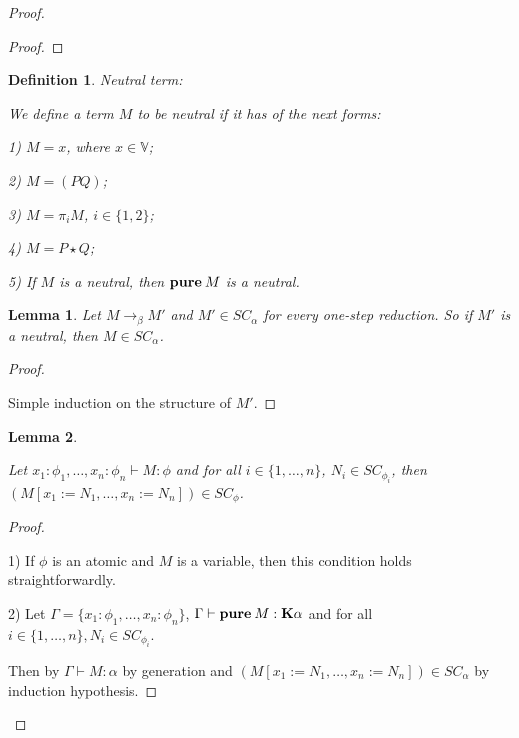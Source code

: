 \documentclass[a4paper]{article}
\newtheorem{lemma}{Lemma}
\newtheorem{defin}{Definition}
\begin{document}
\begin{proof}
\begin{proof}
  \end{proof}

  \begin{defin} Neutral term:

  We define a term $M$ to be neutral if it has of the next forms:

  1) $M = x$, where $x \in \mathbb{V}$;

  2) $M = (P Q)$;

  3) $M = \pi_i M$, $i \in \{ 1,2 \}$;

  4) $M = P \star Q$;

  5) If $M$ is a neutral, then ${\bf pure \: } M$ is a neutral.

  \end{defin}

  \begin{lemma}

  Let $M \rightarrow_{\beta} M'$ and $M' \in SC_{\alpha}$ for every one-step reduction. So if $M'$ is a
  neutral, then $M \in SC_{\alpha}$.

  \end{lemma}

  \begin{proof}

  $ $

  Simple induction on the structure of $M'$.

  \end{proof}

  \begin{lemma}

  $ $

  Let $x_1 : \phi_1, \dots, x_n : \phi_n \vdash M : \phi$ and for all $i \in \{ 1, \dots, n\}$, $N_i
  \in SC_{\phi_i}$, then $(M [x_1 := N_1, \dots, x_n := N_n]) \in SC_{\phi}$.

  \end{lemma}

  \begin{proof}

$ $

  1) If $\phi$ is an atomic and $M$ is a variable, then this condition holds straightforwardly.

  2) Let $\Gamma = \{ x_1 : \phi_1, \dots, x_n : \phi_n \}$, $\Gamma \vdash {\bf pure \: } M :
  \textbf{K}\alpha$ and for all $i \in \{1, \dots, n\}, N_i \in SC_{\phi_i}$.

  Then by $\Gamma \vdash M : \alpha$ by generation
  and $(M [x_1 := N_1, \dots, x_n := N_n]) \in SC_{\alpha}$ by induction hypothesis.


\end{proof}
\end{proof}
\end{document}
